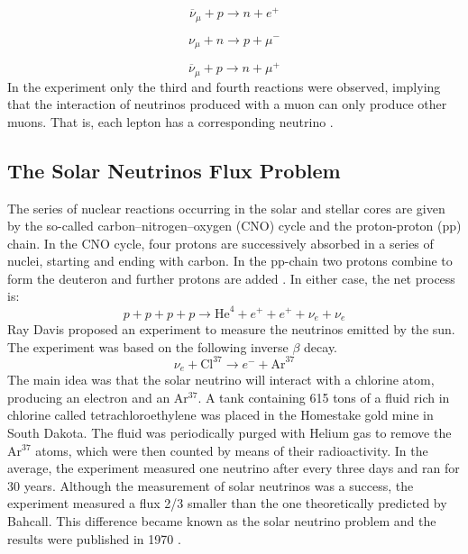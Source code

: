 \begin{equation}
	\overline{\nu}_{\mu} + p \longrightarrow n + e^+
	\label{lss_segunda}
\end{equation}

\begin{equation}
	\nu_{\mu} + n \longrightarrow p + \mu^-
	\label{lss_terceira}
\end{equation}
 
\begin{equation}
	\overline{\nu}_{\mu} + p \longrightarrow n + \mu^+
	\label{lss_quarta}
\end{equation}
%
In the experiment only the third and fourth reactions were observed, implying that the interaction of neutrinos produced with a muon can only produce other muons. That is, each lepton has a corresponding neutrino \cite{two_neutrinos}.

\subsection{The Solar Neutrinos Flux Problem}
The series of nuclear reactions occurring in the solar and stellar cores are given by the so-called carbon–nitrogen–oxygen (CNO) cycle and the proton-proton (pp) chain. In the CNO cycle, four protons are successively absorbed in a series of nuclei, starting and ending with carbon. In the pp-chain two protons combine to form the deuteron and further protons are added \cite{the_story_of_the_neutrino}. In either case, the net process is:
%
\begin{equation}
	p+p+p+p \longrightarrow \textrm{He}^4 +e^+ + e^+ +\nu_e +\nu_e
	\label{solar_reaction}
\end{equation}
%
Ray Davis proposed an experiment to measure the neutrinos emitted by the sun. The experiment was based on the following inverse $\beta$ decay.
%
\begin{equation}
		\nu_e + \textrm{Cl}^{37} \longrightarrow e^- +\textrm{Ar}^{37}
		\label{solar_reaction}
\end{equation}
%
The main idea was that the solar neutrino will interact with a chlorine atom, producing an electron and an Ar$^{37}$. A tank containing 615 tons of a fluid rich in chlorine called tetrachloroethylene was placed in the Homestake gold mine in South Dakota. The fluid was periodically purged with Helium gas to remove the Ar$^{37}$ atoms, which were then counted by means of their radioactivity. In the average, the experiment measured one neutrino after every three days and ran for 30 years. Although the measurement of solar neutrinos was a success, the experiment measured a flux 2/3 smaller than the one theoretically predicted by Bahcall. This difference became known as the solar neutrino problem and the results were published in 1970 \cite{the_story_of_the_neutrino}.

